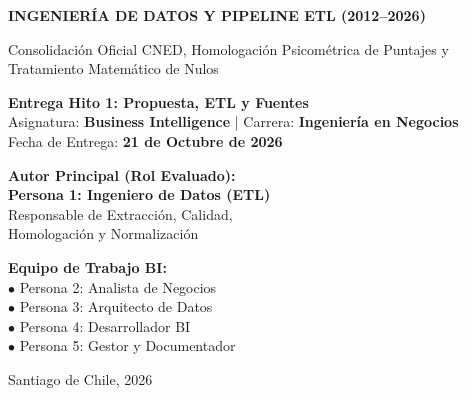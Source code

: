 \documentclass[11pt,a4paper]{article}
\begin{document}
\begin{titlepage}
    \centering
    \vspace*{1cm}
    {\Huge \bfseries \color{primaryblue} INGENIERÍA DE DATOS Y PIPELINE ETL (2012--2026)\par}
    \vspace{0.4cm}
    {\LARGE \color{secondaryblue} Consolidación Oficial CNED, Homologación Psicométrica de Puntajes y Tratamiento Matemático de Nulos\par}
    \vspace{1cm}
    
    \begin{tcolorbox}[colback=lightbg, colframe=primaryblue, width=\textwidth, arc=3mm]
        \centering
        \large \textbf{Entrega Hito 1: Propuesta, ETL y Fuentes}\\[2mm]
        \normalsize Asignatura: \textbf{Business Intelligence} | Carrera: \textbf{Ingeniería en Negocios}\\[1mm]
        Fecha de Entrega: \textbf{21 de Octubre de 2026}
    \end{tcolorbox}
    
    \vspace{2cm}
    \begin{minipage}{0.45\textwidth}
        \textbf{Autor Principal (Rol Evaluado):}\\
        \textbf{\color{primaryblue}Persona 1: Ingeniero de Datos (ETL)}\\
        Responsable de Extracción, Calidad,\\
        Homologación y Normalización
    \end{minipage}
    \hfill
    \begin{minipage}{0.45\textwidth}
        \textbf{Equipo de Trabajo BI:}\\
        $\bullet$ Persona 2: Analista de Negocios\\
        $\bullet$ Persona 3: Arquitecto de Datos\\
        $\bullet$ Persona 4: Desarrollador BI\\
        $\bullet$ Persona 5: Gestor y Documentador
    \end{minipage}

    \vfill
    {\small \color{darkgray} Santiago de Chile, 2026}\par
\end{titlepage}
\end{document}
